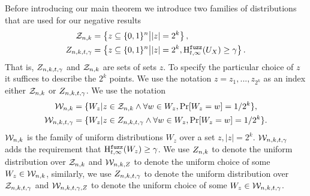 
\label{sec:family}
Before introducing our main theorem we introduce two families of distributions that are used for our negative results
\begin{align*}
\mathcal{Z}_{n,k} &=\left\{z \subseteq \{0, 1\}^n\middle|  |z| = 2^k\right\},\\
Z_{n,k,t,\gamma} &= \left\{z \subseteq \{0, 1\}^n\middle| |z| = 2^k,\mathrm{H}^{\mathtt{fuzz}}_{t,\infty}(U_X) \ge \gamma\right\}.
\end{align*}
That is, $Z_{n,k,t,\gamma}$ and $\mathcal{Z}_{n,k}$ are sets of sets $z$. To specify the particular choice of $z$ it suffices to describe the $2^k$ points. We use the notation $z = z_{1},..., z_{2^k}$ as an index either $\mathcal{Z}_{n,k}$ or $Z_{n,k,t,\gamma}$.
We use the notation 
\begin{align*}
\mathcal{W}_{n,k} &=\{W_z | z \in \mathcal{Z}_{n,k}  \wedge \forall w \in W_z, \Pr[W_z=w]=1/2^k\},\\
\mathcal{W}_{n,k,t,\gamma} &= \{W_z | z\in Z_{n,k,t,\gamma} \wedge \forall w \in W_z, \Pr[W_z=w]=1/2^k\}.
\end{align*}
$\mathcal{W}_{n,k}$ is the family of uniform distributions $W_z$ over a set $z, |z|=2^k$.
$\mathcal{W}_{n,k,t,\gamma}$ adds the requirement that $\mathrm{H}^{\mathtt{fuzz}}_{t,\infty}(W_z)\ge\gamma$. We use $Z_{n,k}$ to denote the uniform distribution over $\mathcal{Z}_{n,k}$ and $\mathcal{W}_{n,k, Z}$ to denote the uniform choice of some $W_z\in \mathcal{W}_{n,k}$, similarly, we use $Z_{n,k,t,\gamma}$ to denote the uniform distribution over $\mathcal{Z}_{n,k,t,\gamma}$ and $\mathcal{W}_{n,k,t,\gamma, Z}$ to denote the uniform choice of some $W_z \in \mathcal{W}_{n,k,t,\gamma}$.